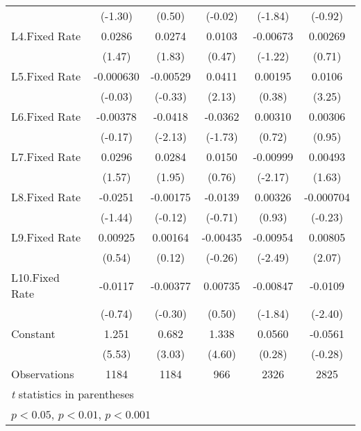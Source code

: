 {\begin{longtable}{l*{5}{c}}
                &  (-1.30)         &   (0.50)         &  (-0.02)         &  (-1.84)         &  (-0.92)         \\
[1em]
L4.Fixed Rate   &   0.0286         &   0.0274         &   0.0103         & -0.00673         &  0.00269         \\
                &   (1.47)         &   (1.83)         &   (0.47)         &  (-1.22)         &   (0.71)         \\
[1em]
L5.Fixed Rate   &-0.000630         & -0.00529         &   0.0411\sym{*}  &  0.00195         &   0.0106\sym{**} \\
                &  (-0.03)         &  (-0.33)         &   (2.13)         &   (0.38)         &   (3.25)         \\
[1em]
L6.Fixed Rate   & -0.00378         &  -0.0418\sym{*}  &  -0.0362         &  0.00310         &  0.00306         \\
                &  (-0.17)         &  (-2.13)         &  (-1.73)         &   (0.72)         &   (0.95)         \\
[1em]
L7.Fixed Rate   &   0.0296         &   0.0284         &   0.0150         & -0.00999\sym{*}  &  0.00493         \\
                &   (1.57)         &   (1.95)         &   (0.76)         &  (-2.17)         &   (1.63)         \\
[1em]
L8.Fixed Rate   &  -0.0251         & -0.00175         &  -0.0139         &  0.00326         &-0.000704         \\
                &  (-1.44)         &  (-0.12)         &  (-0.71)         &   (0.93)         &  (-0.23)         \\
[1em]
L9.Fixed Rate   &  0.00925         &  0.00164         & -0.00435         & -0.00954\sym{*}  &  0.00805\sym{*}  \\
                &   (0.54)         &   (0.12)         &  (-0.26)         &  (-2.49)         &   (2.07)         \\
[1em]
L10.Fixed Rate  &  -0.0117         & -0.00377         &  0.00735         & -0.00847         &  -0.0109\sym{*}  \\
                &  (-0.74)         &  (-0.30)         &   (0.50)         &  (-1.84)         &  (-2.40)         \\
[1em]
Constant        &    1.251\sym{***}&    0.682\sym{**} &    1.338\sym{***}&   0.0560         &  -0.0561         \\
                &   (5.53)         &   (3.03)         &   (4.60)         &   (0.28)         &  (-0.28)         \\
\hline
Observations    &     1184         &     1184         &      966         &     2326         &     2825         \\
\hline\hline
\multicolumn{6}{l}{\footnotesize \textit{t} statistics in parentheses}\\
\multicolumn{6}{l}{\footnotesize \sym{*} \(p<0.05\), \sym{**} \(p<0.01\), \sym{***} \(p<0.001\)}\\
\end{longtable}
}
